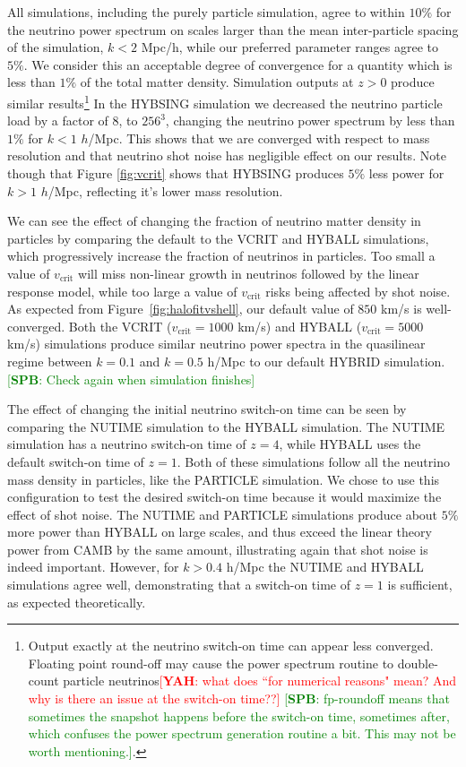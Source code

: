 \documentclass[useAMS, usenatbib]{mnras}
\newcommand{\spb}[1]{{\textcolor{green}{[{\bf SPB}: #1]}}}
\newcommand{\yah}[1]{{\textcolor{red}{[{\bf YAH}: #1]}}}
\begin{document}
All simulations, including the purely particle simulation, agree to within $10\%$ for the neutrino power spectrum on scales larger than the mean inter-particle spacing of the simulation, $k < 2$ Mpc/h, while our preferred parameter ranges agree to $5\%$. We consider this an acceptable degree of convergence for a quantity which is less than $1\%$ of the total matter density. Simulation outputs at $z > 0$ produce similar results\footnote{Output exactly at the neutrino switch-on time can appear less converged. Floating point round-off may cause the power spectrum routine to double-count particle neutrinos\yah{what does ``for numerical reasons" mean? And why is there an issue at the switch-on time??} \spb{fp-roundoff means that sometimes the snapshot happens before the switch-on time, sometimes after, which confuses the power spectrum generation routine a bit. This may not be worth mentioning.}.} In the HYBSING simulation we decreased the neutrino particle load by a factor of $8$, to $256^3$, changing the neutrino power spectrum by less than $1\%$ for $k < 1$ $h$/Mpc. This shows that we are converged with respect to mass resolution and that neutrino shot noise has negligible effect on our results. Note though that Figure \ref{fig:vcrit} shows that HYBSING produces $5\%$ less power for $k > 1$ $h$/Mpc, reflecting it's lower mass resolution.

We can see the effect of changing the fraction of neutrino matter density in particles by comparing the default to the VCRIT and HYBALL simulations, which progressively increase the fraction of neutrinos in particles. Too small a value of $v_\mathrm{crit}$ will miss non-linear growth in neutrinos followed by the linear response model, while too large a value of $v_\mathrm{crit}$ risks being affected by shot noise. As expected from Figure~\ref{fig:halofitvshell}, our default value of $850$ km/s is well-converged. Both the VCRIT ($v_\mathrm{crit} = 1000$ km/s) and HYBALL ($v_\mathrm{crit} = 5000$ km/s) simulations produce similar neutrino power spectra in the quasilinear regime between $k = 0.1$ and $k = 0.5$ h/Mpc to our default HYBRID simulation. \spb{Check again when simulation finishes}

The effect of changing the initial neutrino switch-on time can be seen by comparing the NUTIME simulation to the HYBALL simulation. The NUTIME simulation has a neutrino switch-on time of $z=4$, while HYBALL uses the default switch-on time of $z=1$. Both of these simulations follow all the neutrino mass density in particles, like the PARTICLE simulation. We chose to use this configuration to test the desired switch-on time because it would maximize the effect of shot noise. The NUTIME and PARTICLE simulations produce about $5\%$ more power than HYBALL on large scales, and thus exceed the linear theory power from CAMB by the same amount, illustrating again that shot noise is indeed important. However, for $k > 0.4$ h/Mpc the NUTIME and HYBALL simulations agree well, demonstrating that a switch-on time of $z=1$ is sufficient, as expected theoretically.
\end{document}
